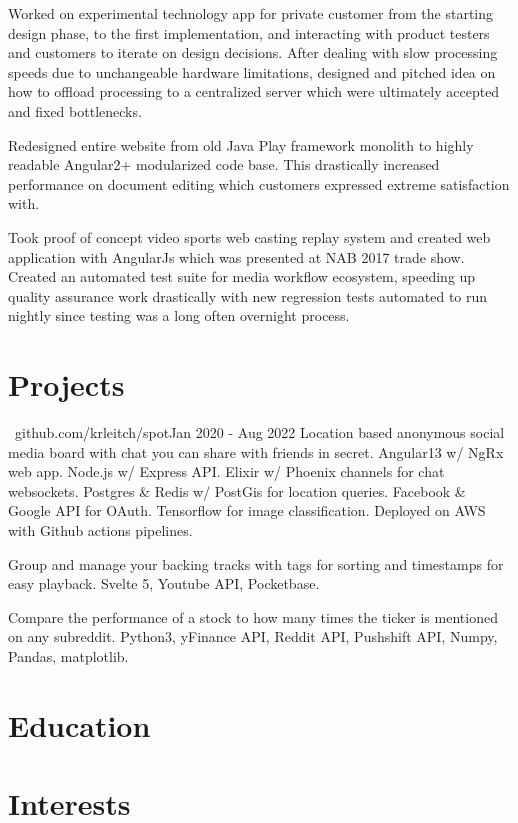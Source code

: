\documentclass{my_resume}
\begin{document}
\workitemstwo
{Worked on experimental technology app for private customer from the starting design phase, to the first implementation, and interacting
with product testers and customers to iterate on design decisions.}
{After dealing with slow processing speeds due to unchangeable hardware limitations, designed and pitched idea on how to offload
processing to a centralized server which were ultimately accepted and fixed bottlenecks.}

\workitemsone
{Redesigned entire website from old Java Play framework monolith to highly readable Angular2+ modularized code base. This drastically increased performance
 on document editing which customers expressed extreme satisfaction with.}

\workitemstwo
{Took proof of concept video sports web casting replay system and created web application with AngularJs
 which was presented at NAB 2017 trade show.}
{Created an automated test suite for media workflow ecosystem, speeding up quality assurance work drastically with new regression tests
 automated to run nightly since testing was a long often overnight process.}

 \section{Projects}

{\faGithub~github.com/krleitch/spot}{Jan 2020 - Aug 2022}
\projectitem
{Location based anonymous social media board with chat you can share with friends in secret.}
{Angular13 w/ NgRx web app. Node.js w/ Express API. Elixir w/ Phoenix channels for chat websockets. Postgres \& Redis w/ PostGis for location queries. Facebook \& Google API for OAuth. Tensorflow for image classification. Deployed on AWS with Github actions pipelines.}

\projectitem
{Group and manage your backing tracks with tags for sorting and timestamps for easy playback.}
{Svelte 5, Youtube API, Pocketbase.}

\projectitem
{Compare the performance of a stock to how many times the ticker is mentioned on any subreddit.}
{Python3, yFinance API, Reddit API, Pushshift API, Numpy, Pandas, matplotlib.}

\section{Education}

\section{Interests}
\end{document}
